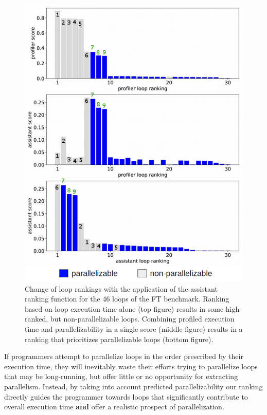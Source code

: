 \begin{figure}[htb!]
\includegraphics[width=1.0\textwidth]{images/ft_filter_nums.pdf}
\caption{Change of loop rankings with the application of the assistant ranking function for the 46 loops of the FT benchmark. Ranking based on loop execution time alone (top figure) results in some high-ranked, but non-parallelizable loops. Combining profiled execution time and parallelizability in a single score (middle figure) results in a ranking that prioritizes parallelizable loops (bottom figure).}
\label{fig:ft_loop_ranking}
\end{figure}
If programmers attempt to parallelize loops in the order prescribed by their execution time, they will inevitably waste
their efforts trying to parallelize loops that may be long-running, but offer little or no opportunity for extracting parallelism. Instead, by taking into account predicted parallelizability our ranking directly guides the programmer towards loops that significantly contribute to overall execution time \textbf{and} offer a realistic prospect of parallelization.
